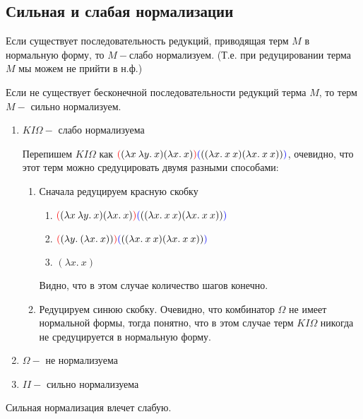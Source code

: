 	\subsection{Сильная и слабая нормализации}
	\begin{definition}Если существует последовательность редукций, приводящая терм $M$ в нормальную форму, то $M-$слабо нормализуем. (Т.е. при редуцировании терма $M$ мы можем не прийти в н.ф.)\end{definition} 
	\begin{definition}Если не существует бесконечной последовательности редукций терма $M$, то терм $M-$ сильно нормализуем.\end{definition} 
	 \begin{statement}
	 \end{statement}
	 \begin{enumerate}
	 	\item $KI\Omega-$ слабо нормализуема
	 		\begin{example}\end{example}
	 		Перепишем $KI\Omega$ как ${\color{red}(}(\lambda x\:\lambda y.\:x)(\lambda x.\:x){\color{red})}{\color{blue}(}((\lambda x.\:x\:x)(\lambda x.\:x\:x)){\color{blue})}$, очевидно, что этот терм можно средуцировать двумя разными способами:\\
	 		\begin{enumerate}
	 			\item Сначала редуцируем красную скобку 
	 				\begin{enumerate}
	 					\item ${\color{red}(}(\lambda x\:\lambda y.\:x)(\lambda x.\:x){\color{red})}{\color{blue}(}((\lambda x.\:x\:x)(\lambda x.\:x\:x)){\color{blue})}$
	 					\item ${\color{red}(}(\lambda y.\:(\lambda x.\:x)){\color{red})}{\color{blue}(}((\lambda x.\:x\:x)(\lambda x.\:x\:x)){\color{blue})}$
	 					\item $(\lambda x.\:x)$
	 				\end{enumerate}
	 				Видно, что в этом случае количество шагов конечно.
	 			\item Редуцируем синюю скобку. Очевидно, что комбинатор $\Omega$ не имеет нормальной формы, тогда понятно, что в этом случае терм $KI\Omega$ никогда не средуцируется в нормальную форму.
	 		\end{enumerate}
	 	\item $\Omega-$ не нормализуема
	 	\item $II-$ сильно нормализуема
	 \end{enumerate}
	 \begin{lemma}Сильная нормализация влечет слабую.
	 \end{lemma}

